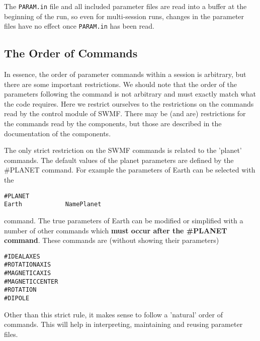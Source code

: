 The {\tt PARAM.in} file and all included parameter files are read into 
a buffer at the beginning of the run, so even for multi-session runs, 
changes in the parameter files have no effect once {\tt PARAM.in} 
has been read. 

\subsection{The Order of Commands \label{section:order}}

In essence, the order of parameter commands within a
session is arbitrary, but there are some important restrictions.  
We should note that the order of the parameters following 
the command is not arbitrary and must exactly match what the code requires.  
Here we restrict ourselves to the restrictions on the commands read by
the control module of SWMF. There may be (and are) restrictions
for the commands read by the components, but those are described
in the documentation of the components.

The only strict restriction on the SWMF commands is related
to the 'planet' commands. The default values of the 
planet parameters are defined by the \#PLANET command.
For example the parameters of Earth can be selected with the
\begin{verbatim}
#PLANET
Earth            NamePlanet
\end{verbatim}
command. The true parameters of Earth can be modified or simplified
with a number of other commands which {\bf must occur after the
\#PLANET command}. These commands are (without showing their parameters)
\begin{verbatim}
#IDEALAXES
#ROTATIONAXIS
#MAGNETICAXIS
#MAGNETICCENTER
#ROTATION
#DIPOLE
\end{verbatim}
Other than this strict rule, it makes sense to follow a 'natural'
order of commands. This will help in interpreting, maintaining
and reusing parameter files.

